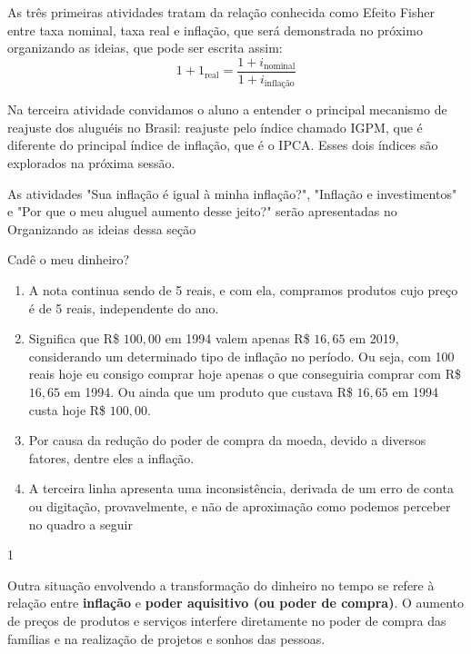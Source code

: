 \begin{texto}
{  As três primeiras atividades tratam da relação conhecida como Efeito Fisher entre taxa nominal, taxa real e inflação, que será demonstrada no próximo organizando as ideias, que pode ser escrita assim:
  \begin{equation*}
  1+1_{\text{real}}=\frac{1+i_{\text{nominal}}}{1+i_{\text{inflação}}}
  \end{equation*}

  Na terceira atividade convidamos o aluno a entender o principal mecanismo de reajuste dos aluguéis no Brasil: reajuste pelo índice chamado IGPM, que é diferente do principal índice de inflação, que é o IPCA. Esses dois índices são explorados na próxima sessão. 

  As atividades "Sua inflação é igual à minha inflação?", "Inflação e investimentos" e "Por que o meu aluguel aumento desse jeito?" serão apresentadas no Organizando as ideias dessa seção

}
\end{texto}
\clearmargin
\begin{answer}{Cadê o meu dinheiro?}
{
\begin{enumerate}
\item A nota continua sendo de 5 reais, e com ela, compramos produtos cujo preço é de 5 reais, independente do ano.
\item Significa que R\$ $100{,}00$ em 1994 valem apenas R\$ $16{,}65$ em 2019, considerando um determinado tipo de inflação no período. Ou seja, com 100 reais hoje eu consigo comprar hoje apenas o que conseguiria comprar com R\$ $16{,}65$ em 1994. Ou ainda que um produto que custava R\$ $16{,}65$ em 1994 custa hoje R\$ $100{,}00$. 
\item Por causa da redução do poder de compra da moeda, devido a diversos fatores, dentre eles a inflação.
\item A terceira linha apresenta uma inconsistência, derivada de um erro de conta ou digitação, provavelmente, e não de aproximação como podemos perceber no quadro a seguir
\end{enumerate}

}{1}
\end{answer}

Outra situação envolvendo a transformação do dinheiro no tempo se refere à relação entre \textbf{inflação} e \textbf{poder aquisitivo (ou poder de compra)}. O aumento de preços de produtos e serviços interfere diretamente no poder de compra das famílias e na realização de projetos e sonhos das pessoas.

